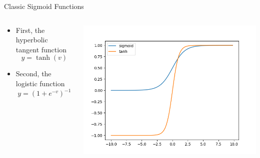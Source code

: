 \documentclass[aspectratio=169]{beamer}
\begin{document}
\begin{frame}{Classic Sigmoid Functions}

\begin{columns}
\begin{column}{0.6\textwidth}
\begin{itemize}
		\item First, the hyperbolic tangent function
		$$y = \tanh(v)$$
		\item Second, the logistic function
		$$y = (1 + e^{-v})^{-1}$$
\end{itemize}
\end{column}
\begin{column}{0.5\textwidth}
\includegraphics[width=1\textwidth]{lectFF/sigmoidTanh.png}
\end{column}
\end{columns}
\end{frame}
\end{document}
